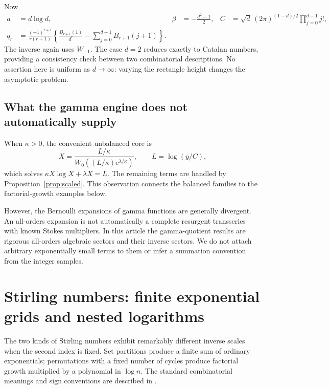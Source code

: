 \documentclass[11pt,a4paper]{article}
\numberwithin{equation}{section}
\theoremstyle{definition}
\theoremstyle{remark}
\newcommand{\ee}{\mathrm e}
\begin{document}
Now
\begin{align}
 a&=d\log d,&
 \beta&=-\frac{d^2-1}{2},&
 C&=\sqrt d\,(2\pi)^{(1-d)/2}\prod_{j=0}^{d-1}j!,
 \label{eq:tableaux-constants}\\
 q_r&=\frac{(-1)^{r+1}}{r(r+1)}
 \left\{\frac{B_{r+1}(1)}{d^r}
             -\sum_{j=0}^{d-1}B_{r+1}(j+1)\right\}.
 \label{eq:tableaux-q}
\end{align}
The inverse again uses $W_{-1}$. The case $d=2$ reduces exactly to Catalan numbers, providing a consistency check between two combinatorial descriptions. No assertion here is uniform as $d\to\infty$: varying the rectangle height changes the asymptotic problem.

\subsection{What the gamma engine does not automatically supply}

When $\kappa>0$, the convenient unbalanced core is
\begin{equation}
 X=\frac{L/\kappa}{W_0\!\left((L/\kappa)\ee^{\lambda/\kappa}\right)},
 \qquad L=\log(y/C),
 \label{eq:unbalanced-core}
\end{equation}
which solves $\kappa X\log X+\lambda X=L$. The remaining terms are handled by Proposition~\ref{prop:scaled}. This observation connects the balanced families to the factorial-growth examples below.

However, the Bernoulli expansions of gamma functions are generally divergent. An all-orders expansion is not automatically a complete resurgent transseries with known Stokes multipliers. In this article the gamma-quotient results are rigorous all-orders algebraic sectors and their inverse sectors. We do not attach arbitrary exponentially small terms to them or infer a summation convention from the integer samples.

\section{Stirling numbers: finite exponential grids and nested logarithms}
\label{sec:stirling}

The two kinds of Stirling numbers exhibit remarkably different inverse scales when the second index is fixed. Set partitions produce a finite sum of ordinary exponentials; permutations with a fixed number of cycles produce factorial growth multiplied by a polynomial in $\log n$. The standard combinatorial meanings and sign conventions are described in \cite{dlmfstirling,wlstirling2,wlstirling1}.
\end{document}
